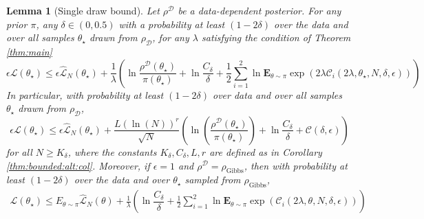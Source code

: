 \documentclass{article}
\newcommand{\train}{\mathcal{D}}
\newtheorem{lemma}[theorem]{Lemma}
\newcommand{\bE}{\mathbf{E}}
\begin{document}
 \begin{lemma}[Single draw bound]
\label{lem:single_draw}
 Let $\rho^{\train}$ be a data-dependent posterior. 
 For any prior $\pi$,  any $\delta \in (0,0.5)$
 with a probability at least  $(1-2\delta)$ over the data and over all samples $\theta_{\star}$ drawn from $\rho_{\train}$,
 for any $\lambda$ satisfying the condition of Theorem \ref{thm:main}
  \begin{equation}
\label{RenyiBound:single_draw}
 \epsilon \mathcal{L}(\theta_{\star}) \le  \epsilon  \hat{\mathcal{L}}_N(\theta_{\star})+ 
 \frac{1}{\lambda} \left(\ln \frac{\rho^{\train}(\theta_{\star})}{\pi(\theta_{\star})} + \ln\dfrac{C_{\delta}}{\delta} + \frac{1}{2}\sum_{i=1}^{2} \ln \bE_{\theta \sim \pi} \exp(2\lambda \mathcal{C}_i(2\lambda,\theta_{\star},N,\delta,\epsilon))\right)
  \end{equation}
  In particular, with probability at least $(1-2\delta)$ over data and over all samples  $\theta_{\star}$ drawn from $\rho_{\train}$, 
  \begin{equation}
  \label{RenyiBound:single_draw1}
  \epsilon \mathcal{L}(\theta_{\star}) \le \epsilon \hat{\mathcal{L}}_N(\theta_{\star})+\frac{L(\ln(N))^{r}}{\sqrt{N}}(\ln\left(\frac{\rho^{\train}(\theta_{\star})}{\pi(\theta_{\star})}\right)+\ln\frac{C_{\delta}}{\delta} + 
  \mathcal{C}(\delta,\epsilon))
  \end{equation}
  for all $N \ge K_{\delta}$, where the constants $K_{\delta},C_{\delta},L,r$ are defined as in Corollary \ref{thm:bounded:alt:col}.
 Moreover, if  $\epsilon=1$ and 
 $\rho^{\train}=\rho_{\text{Gibbs}}$, then with probability at  least  $(1-2\delta)$
  over the data and over $\theta_{\star}$
  sampled from $\rho_{\text{Gibbs}}$,
  \begin{equation}
\label{RenyiBound:single_draw:giibs}
\begin{aligned}
 \mathcal{L}(\theta_{\star}) \le  
 E_{\theta \sim \pi} \hat{\mathcal{L}}_N(\theta) +  \frac{1}{\lambda} \left(\ln\dfrac{C_{\delta}}{\delta} + \frac{1}{2}\sum_{i=1}^{2} \ln \bE_{\theta \sim \pi} \exp(\mathcal{C}_i(2\lambda,\theta,N,\delta,\epsilon))\right) \\
\end{aligned}
  \end{equation}

\end{lemma}
\end{document}
